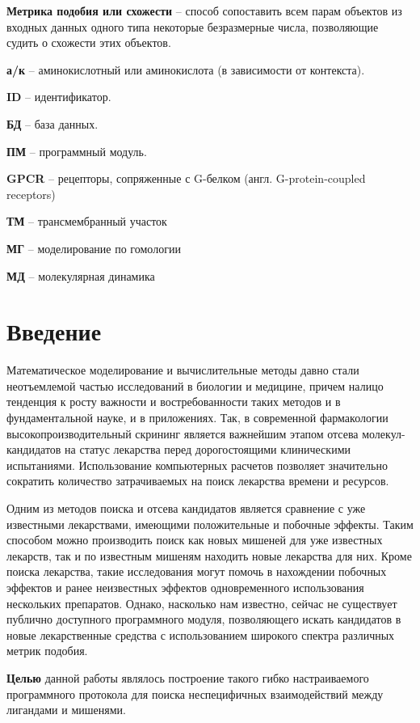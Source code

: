 \documentclass[a4paper,14pt]{article}         %
\begin{document}
\textbf{Метрика подобия или схожести} -- способ сопоставить всем парам объектов из входных данных одного типа некоторые безразмерные числа, позволяющие судить о схожести этих объектов.

\textbf{а/к} -- аминокислотный или аминокислота (в зависимости от контекста).

\textbf{ID} -- идентификатор.

\textbf{БД} -- база данных.

\textbf{ПМ} -- программный модуль.

\color{gray}
\textbf{GPCR} -- рецепторы, сопряженные с G-белком (англ. G-protein-coupled receptors)

\textbf{ТМ} -- трансмембранный участок

\textbf{МГ} -- моделирование по гомологии

\textbf{МД} -- молекулярная динамика
\color{black}

\newpage
\section{Введение}
Математическое моделирование и вычислительные методы давно стали неотъемлемой частью исследований в биологии и медицине, причем налицо тенденция к росту важности и востребованности таких методов и в фундаментальной науке, и в приложениях. Так, в современной фармакологии высокопроизводительный скрининг является важнейшим этапом отсева молекул-кандидатов на статус лекарства перед дорогостоящими клиническими испытаниями. Использование компьютерных расчетов позволяет значительно сократить количество затрачиваемых на поиск лекарства времени и ресурсов.

Одним из методов поиска и отсева кандидатов является сравнение с уже известными лекарствами, имеющими положительные и побочные эффекты. Таким способом можно производить поиск как новых мишеней для уже известных лекарств, так и по известным мишеням находить новые лекарства для них. Кроме поиска лекарства, такие исследования могут помочь в нахождении побочных эффектов и ранее неизвестных эффектов одновременного использования нескольких препаратов. Однако, насколько нам известно, сейчас не существует публично доступного программного модуля, позволяющего искать кандидатов в новые лекарственные средства с использованием широкого спектра различных метрик подобия.

\textbf{Целью} данной работы являлось построение такого гибко настраиваемого программного протокола для поиска неспецифичных взаимодействий между лигандами и мишенями. 
\end{document}
